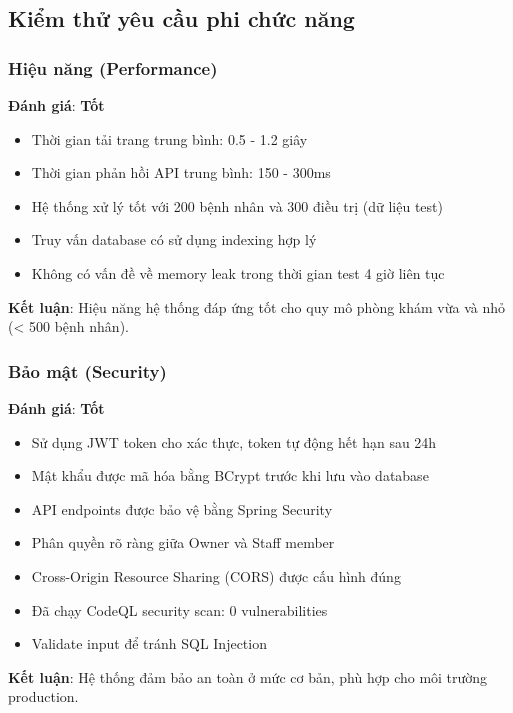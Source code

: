 \subsection{Kiểm thử yêu cầu phi chức năng}

\subsubsection{Hiệu năng (Performance)}

\textbf{Đánh giá}: \textbf{Tốt}

\begin{itemize}
    \item Thời gian tải trang trung bình: 0.5 - 1.2 giây
    \item Thời gian phản hồi API trung bình: 150 - 300ms
    \item Hệ thống xử lý tốt với 200 bệnh nhân và 300 điều trị (dữ liệu test)
    \item Truy vấn database có sử dụng indexing hợp lý
    \item Không có vấn đề về memory leak trong thời gian test 4 giờ liên tục
\end{itemize}

\textbf{Kết luận}: Hiệu năng hệ thống đáp ứng tốt cho quy mô phòng khám vừa và nhỏ (< 500 bệnh nhân).

\subsubsection{Bảo mật (Security)}

\textbf{Đánh giá}: \textbf{Tốt}

\begin{itemize}
    \item Sử dụng JWT token cho xác thực, token tự động hết hạn sau 24h
    \item Mật khẩu được mã hóa bằng BCrypt trước khi lưu vào database
    \item API endpoints được bảo vệ bằng Spring Security
    \item Phân quyền rõ ràng giữa Owner và Staff member
    \item Cross-Origin Resource Sharing (CORS) được cấu hình đúng
    \item Đã chạy CodeQL security scan: 0 vulnerabilities
    \item Validate input để tránh SQL Injection
\end{itemize}

\textbf{Kết luận}: Hệ thống đảm bảo an toàn ở mức cơ bản, phù hợp cho môi trường production.

